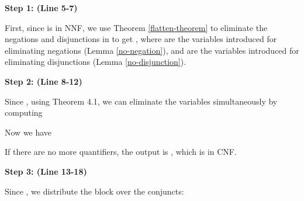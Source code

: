 \documentclass[envcountsect]{llncs}
\begin{document}
 {\bf Step 1: (Line 5-7)} 

First, since  is in NNF, we use Theorem \ref{flatten-theorem} to eliminate the negations and disjunctions in  to get , where  are the variables introduced for eliminating negations (Lemma \ref{no-negation}), and  are the variables introduced for eliminating disjunctions (Lemma \ref{no-disjunction}).


 {\bf Step 2: (Line 8-12)}

Since , using Theorem 4.1, we can eliminate the variables  simultaneously by computing  

Now we have 

If there are no more quantifiers, the output is , which is in CNF.


 {\bf Step 3: (Line 13-18)} 

Since , we distribute the block  over the conjuncts:
\end{document}
